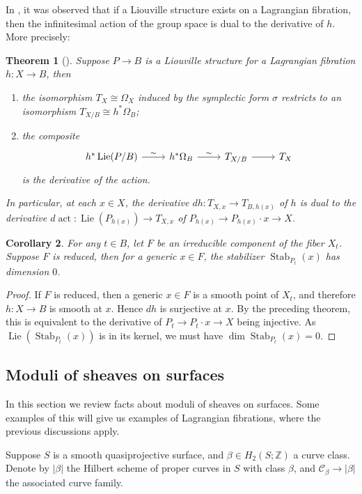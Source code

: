 \documentclass{amsart}
\theoremstyle{plain}
\newtheorem{theorem}{Theorem}[section]
\newtheorem{corollary}[theorem]{Corollary}
\theoremstyle{definition}
\theoremstyle{remark}
\begin{document}
In \cite{dCRS}, it was observed that if a Liouville structure exists on a Lagrangian fibration, then the infinitesimal action of the group space is dual to the derivative of $h$.
More precisely:
\begin{theorem}[{\cite[Lemma 2.3.1]{dCRS}}]
    Suppose $P\to B$ is a Liouville structure for a Lagrangian fibration $h:X\to B$, then
    \begin{enumerate}
        \item the isomorphism $T_X\cong\Omega_X$ induced by the symplectic form $\sigma$ restricts to an isomorphism $T_{X/B}\cong h^\ast \Omega_B$;
        \item the composite
        \[\begin{tikzcd}
            h^\ast\operatorname{Lie}(P/B)\rar{\sim}&h^\ast\Omega_B\rar{\sim}&T_{X/B}\rar& T_X
        \end{tikzcd}\]
        is the derivative of the action.
    \end{enumerate}
    In particular, at each $x\in X$, the derivative $dh:T_{X,x}\to T_{B,h(x)}$ of $h$ is dual to the derivative $d\operatorname{act}:\operatorname{Lie}(P_{h(x)})\to T_{X,x}$ of $P_{h(x)}\to P_{h(x)}\cdot x\to X$.
\end{theorem}
\begin{corollary}\label{symp:nrd_stab}
    For any $t\in B$, let $F$ be an irreducible component of the fiber $X_t$.
    Suppose $F$ is reduced, then for a generic $x\in F$, the stabilizer $\operatorname{Stab}_{P_t}(x)$ has dimension $0$. 
\end{corollary}
\begin{proof}
    If $F$ is reduced, then a generic $x\in F$ is a smooth point of $X_t$, and therefore $h:X\to B$ is smooth at $x$.
    Hence $dh$ is surjective at $x$.
    By the preceding theorem, this is equivalent to the derivative of $P_t\to P_t\cdot x\to X$ being injective.
    As $\operatorname{Lie}(\operatorname{Stab}_{P_t}(x))$ is in its kernel, we must have $\dim\operatorname{Stab}_{P_t}(x)=0$.
\end{proof}
\subsection{Moduli of sheaves on surfaces}\label{ss:moduliofsheaves}
In this section we review facts about moduli of sheaves on surfaces.
Some examples of this will give us examples of Lagrangian fibrations, where the previous discussions apply.

Suppose $S$ is a smooth quasiprojective surface, and $\beta\in H_2(S;\mathbb Z)$ a curve class.
Denote by $|\beta|$ the Hilbert scheme of proper curves in $S$ with class $\beta$, and $\mathcal C_\beta\to|\beta|$ the associated curve family.
\end{document}
